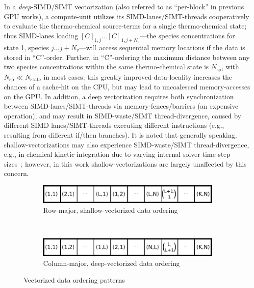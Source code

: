 \documentclass[12pt,number,sort&compress,preprint]{elsarticle}
\begin{document}
In a \textit{deep}-SIMD\slash SIMT vectorization (also referred to as ``per-block'' in previous GPU works), a compute-unit utilizes its SIMD-lanes\slash SIMT-threads cooperatively to evaluate the thermo-chemical source-terms for a single thermo-chemical state; thus SIMD-lanes loading $[C]_{1, j} \ldots [C]_{1, j + N_v}$---the species concentrations for state 1, species $j \ldots j + N_v$---will access sequential memory locations if the data is stored in ``C''-order.
Further, in ``C''-ordering the maximum distance between any two species concentrations within the same thermo-chemical state is $N_{\text{sp}}$, with $N_{\text{sp}} \ll N_{\text{state}}$ in most cases; this greatly improved data-locality increases the chances of a cache-hit on the CPU, but may lead to uncoalesced memory-accesses on the GPU.
In addition, a deep vectorization requires both synchronization between SIMD-lanes\slash SIMT-threads via memory-fences\slash barriers (an expensive operation), and may result in SIMD-waste\slash SIMT thread-divergence, caused by different SIMD-lanes\slash SIMT-threads executing different instructions (e.g., resulting from different if\slash then branches).
It is noted that generally speaking, shallow-vectorizations may also experience SIMD-waste\slash SIMT thread-divergence, e.g., in chemical kinetic integration due to varying internal solver time-step sizes~\cite{CurtisGPU:2017}; however, in this work shallow-vectorizations are largely unaffected by this concern.

\begin{figure}[htb]
  \centering
  \begin{minipage}{0.6\linewidth}
    \begin{subfigure}[t]{\textwidth}
	\includegraphics[width=\textwidth]{row_major_split.pdf}
	\caption{Row-major, shallow-vectorized data ordering}
	\label{F:row_major_split}
    \end{subfigure}
    \\
    \begin{subfigure}[t]{\textwidth}
	\includegraphics[width=\textwidth]{column_major_split.pdf}
	\caption{Column-major, deep-vectorized data ordering}
	\label{F:column_major_split}
    \end{subfigure}
  \end{minipage}
  \caption{Vectorized data ordering patterns}
  \label{F:vector_data}
\end{figure}
\end{document}
